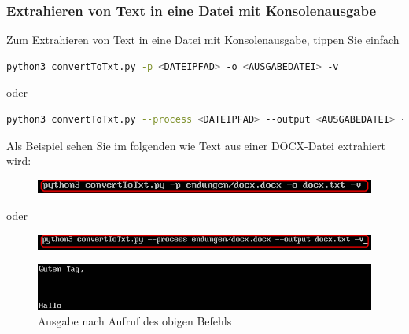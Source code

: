 \documentclass[12pt]{scrartcl}
\begin{document}
\subsubsection{Extrahieren von Text in eine Datei mit Konsolenausgabe}
\label{sec:first-steps-extraction-file-with}
Zum Extrahieren von Text in eine Datei mit Konsolenausgabe, tippen Sie einfach 
\begin{lstlisting}[language=bash]
python3 convertToTxt.py -p <DATEIPFAD> -o <AUSGABEDATEI> -v
\end{lstlisting}
\begin{center}
oder
\end{center}
\begin{lstlisting}[language=bash] 
python3 convertToTxt.py --process <DATEIPFAD> --output <AUSGABEDATEI> -v
\end{lstlisting}
 Als Beispiel sehen Sie im folgenden wie Text aus einer DOCX-Datei extrahiert wird:
\begin{figure}[htbp]
\includegraphics[width=1.0\textwidth]{ersteSchritteExtractIntoFileWithConsole001}\par\vspace{0.25cm}
\label{fig:ersteSchritteExtractIntoFileWithConsole001}
\end{figure}
\begin{center}
oder
\end{center}
\begin{figure}[htbp]
\includegraphics[width=1.0\textwidth]{ersteSchritteExtractIntoFileWithConsole002}\par

\vspace{0.25cm}
\label{fig:ersteSchritteExtractIntoFileWithConsole002}
\end{figure}
\begin{figure}[htbp]
\centering
\includegraphics[width=1.0\textwidth]{ersteSchritteExtractIntoFileWithConsole003}\par\vspace{0.25cm}
\caption{Ausgabe nach Aufruf des obigen Befehls}
\end{figure}
\newpage
\end{document}
